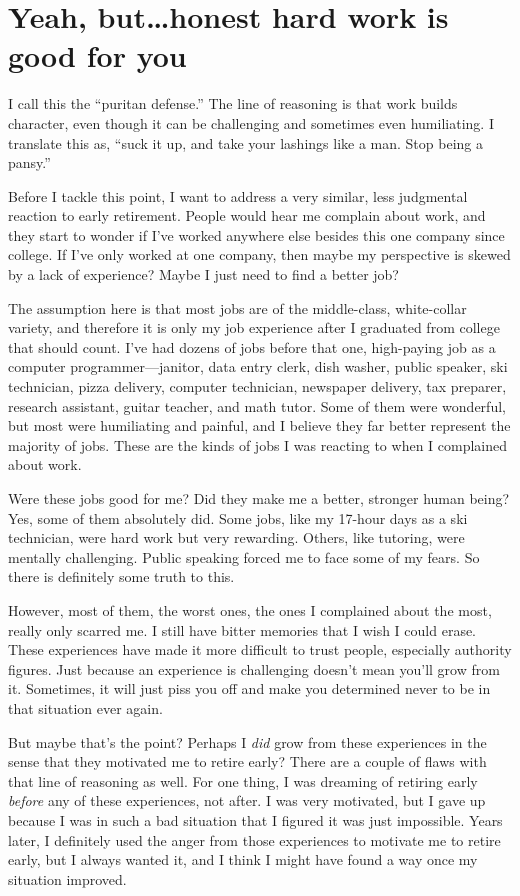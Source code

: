 \section{Yeah, but\ldots honest hard work is good for you}
I call this the ``puritan defense.'' The line of reasoning is that work builds character, even though it can be challenging and sometimes even humiliating. I translate this as, ``suck it up, and take your lashings like a man. Stop being a pansy.''

Before I tackle this point, I want to address a very similar, less judgmental reaction to early retirement. People would hear me complain about work, and they start to wonder if I've worked anywhere else besides this one company since college. If I've only worked at one company, then maybe my perspective is skewed by a lack of experience? Maybe I just need to find a better job?

The assumption here is that most jobs are of the middle-class, white-collar variety, and therefore it is only my job experience after I graduated from college that should count. I've had dozens of jobs before that one, high-paying job as a computer programmer---janitor, data entry clerk, dish washer, public speaker, ski technician, pizza delivery, computer technician, newspaper delivery, tax preparer, research assistant, guitar teacher, and math tutor. Some of them were wonderful, but most were humiliating and painful, and I believe they far better represent the majority of jobs. These are the kinds of jobs I was reacting to when I complained about work.

Were these jobs good for me? Did they make me a better, stronger human being? Yes, some of them absolutely did. Some jobs, like my 17-hour days as a ski technician, were hard work but very rewarding. Others, like tutoring, were mentally challenging. Public speaking forced me to face some of my fears. So there is definitely some truth to this.

However, most of them, the worst ones, the ones I complained about the most, really only scarred me. I still have bitter memories that I wish I could erase. These experiences have made it more difficult to trust people, especially authority figures. Just because an experience is challenging doesn't mean you'll grow from it. Sometimes, it will just piss you off and make you determined never to be in that situation ever again.

But maybe that's the point? Perhaps I \emph{did} grow from these experiences in the sense that they motivated me to retire early? There are a couple of flaws with that line of reasoning as well. For one thing, I was dreaming of retiring early \emph{before} any of these experiences, not after. I was very motivated, but I gave up because I was in such a bad situation that I figured it was just impossible. Years later, I definitely used the anger from those experiences to motivate me to retire early, but I always wanted it, and I think I might have found a way once my situation improved.


